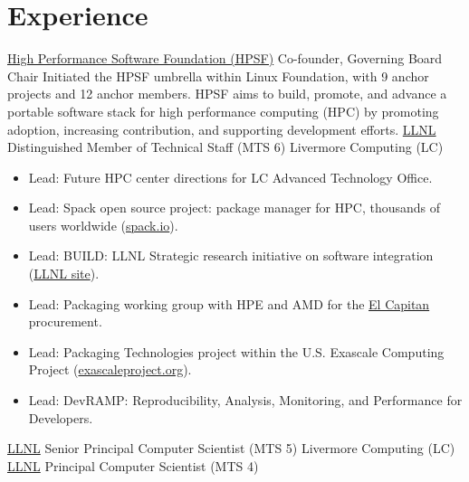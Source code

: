 \section{Experience}
                {\href{https://hpsf.io}{High Performance Software Foundation (HPSF)}}
                {Co-founder, Governing Board Chair}{}{}
                {Initiated the HPSF umbrella within Linux Foundation,
                  with 9 anchor projects and 12 anchor members. HPSF aims to build, promote, and
                  advance a portable software stack for high performance computing (HPC) by
                  promoting adoption, increasing contribution, and supporting development efforts.
                }
		{\href{http://www.llnl.gov}{LLNL}}
		{Distinguished Member of Technical Staff (MTS 6)}
		{}{Livermore Computing (LC)}
		{
                  \begin{itemize}
                  \item Lead: Future HPC center directions for LC Advanced Technology Office.
                  \item Lead: Spack open source project: package manager for HPC, thousands of users worldwide (\href{https://spack.io}{spack.io}).
                  \item Lead: BUILD: LLNL Strategic research initiative on software integration (\href{https://computing.llnl.gov/projects/build}{LLNL site}).
                  \item Lead: Packaging working group with HPE and AMD for the \href{https://www.llnl.gov/news/llnl-and-hpe-partner-amd-el-capitan-projected-worlds-fastest-supercomputer}{El Capitan} procurement.
                  \item Lead: Packaging Technologies project within the U.S. Exascale Computing Project (\href{https://exascaleproject.org}{exascaleproject.org}).
                  \item Lead: DevRAMP: Reproducibility, Analysis, Monitoring, and Performance for Developers.
                \end{itemize}
                }
		{\href{http://www.llnl.gov}{LLNL}}
		{Senior Principal Computer Scientist (MTS 5)}
		{Livermore Computing (LC)}
                {}{}
		{\href{http://www.llnl.gov}{LLNL}}
		{Principal Computer Scientist (MTS 4)}
